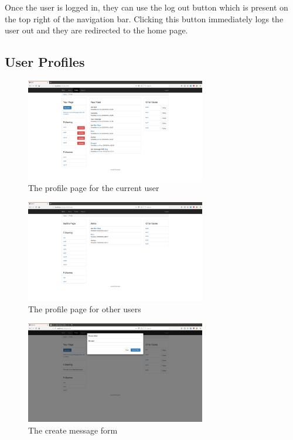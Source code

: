 Once the user is logged in, they can use the log out button which is present
on the top right of the navigation bar. Clicking this button immediately logs
the user out and they are redirected to the home page.

\subsection{User Profiles}

\begin{figure}[H]
	\centering
	\includegraphics[width=0.7\textwidth]{final_report/pics/profile.png}
	\caption{The profile page for the current user}
	\label{fig:wireProfile}
\end{figure}

\begin{figure}[H]
	\centering
	\includegraphics[width=0.7\textwidth]{final_report/pics/otherProfile.png}
	\caption{The profile page for other users}
	\label{fig:wireOtherProfile}
\end{figure}

\begin{figure}[H]
	\centering
	\includegraphics[width=0.7\textwidth]{final_report/pics/createWireForm.png}
	\caption{The create message form}
	\label{fig:wireCreateForm}
\end{figure}


